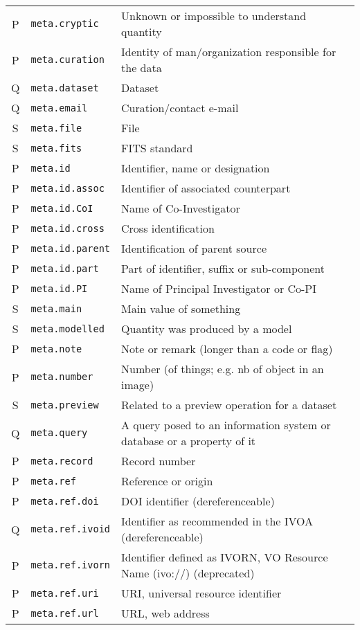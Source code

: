 \documentclass[11pt,a4paper]{ivoa}
\begin{document}
\begin{longtable}[h!]{c|p{40ex}|p{}}
P & {\tt meta.cryptic} & Unknown or impossible to understand quantity\\
P & {\tt meta.curation} & Identity of man/organization responsible for the data\\
Q & {\tt meta.dataset} & Dataset\\
Q & {\tt meta.email} & Curation/contact e-mail\\
S & {\tt meta.file} & File\\
S & {\tt meta.fits} & FITS standard\\
P & {\tt meta.id} & Identifier, name or designation\\
P & {\tt meta.id.assoc} & Identifier of associated counterpart\\
P & {\tt meta.id.CoI} & Name of Co-Investigator\\
P & {\tt meta.id.cross} & Cross identification\\
P & {\tt meta.id.parent} & Identification of parent source\\
P & {\tt meta.id.part} & Part of identifier, suffix or sub-component\\
P & {\tt meta.id.PI} & Name of Principal Investigator or Co-PI\\
S & {\tt meta.main} & Main value of something\\
S & {\tt meta.modelled} & Quantity was produced by a model\\
P & {\tt meta.note} & Note or remark (longer than a code or flag)\\
P & {\tt meta.number} & Number (of things; e.g. nb of object in an image)\\
S & {\tt meta.preview} & Related to a preview operation for a dataset\\
Q & {\tt meta.query} & A query posed to an information system or database or a property of it\\
P & {\tt meta.record} & Record number\\
P & {\tt meta.ref} & Reference or origin\\
P & {\tt meta.ref.doi} & DOI identifier (dereferenceable)\\
Q & {\tt meta.ref.ivoid} & Identifier as recommended  in the IVOA  (dereferenceable)\\
P & {\tt meta.ref.ivorn} & Identifier defined as IVORN, VO Resource Name (ivo://)  (deprecated)\\
P & {\tt meta.ref.uri} & URI, universal resource identifier\\
P & {\tt meta.ref.url} & URL, web address\\

\end{longtable}
\end{document}
